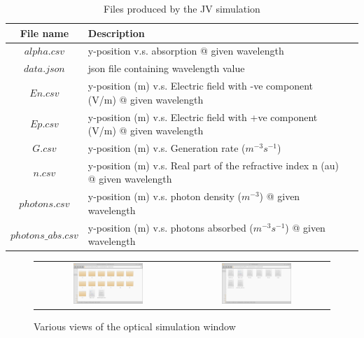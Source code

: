 \begin{table}[H]
\begin{center}
\begin{tabular}{ |c|l|c| } 
 \hline
	File name 			& 	Description  \\ 
 \hline
	$alpha.csv$			&	y-position v.s. absorption @ given wavelength \\ 
	$data.json$			&	json file containing wavelength value \\ 
	$En.csv$ 			&	y-position (m) v.s. Electric field with -ve component (V/m)  @ given wavelength \\ 
	$Ep.csv$ 			&	y-position (m) v.s. Electric field with +ve component (V/m) @ given wavelength \\ 
	$G.csv$ 			&	y-position (m) v.s. Generation rate ($m^{-3} s^{-1}$)\\ 
	$n.csv$ 			&	y-position (m) v.s. Real part of the refractive index n (au) @ given wavelength\\ 
	$photons.csv$ 		&	y-position (m) v.s. photon density ($m^{-3}$) @ given wavelength \\ 
	$photons\_abs.csv$ 	&	y-position (m) v.s. photons absorbed ($m^{-3} s^{-1}$) @ given wavelength\\ 
 \hline
\end{tabular}
\caption{Files produced by the JV simulation}
\label{tab:jv_output}
\end{center}
\end{table}


\begin{figure}[H]
\centering
\begin{tabular}{ c c }

\includegraphics[width=0.5\textwidth,height=0.35\textwidth]{./images/transfer_matrix/snapshots_main_dir.png}

&
\includegraphics[width=0.5\textwidth,height=0.35\textwidth]{./images/transfer_matrix/snapshots_sub_dir.png}

\\
\end{tabular}
\caption{Various views of the optical simulation window}
\label{fig:optical_snapshots_dir}
\end{figure}

